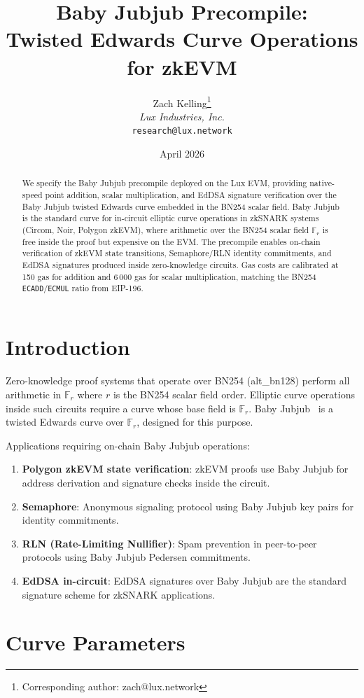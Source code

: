 \documentclass[11pt,a4paper]{article}
\title{Baby Jubjub Precompile:\\Twisted Edwards Curve Operations for zkEVM}
\author{
Zach Kelling\thanks{Corresponding author: zach@lux.network}\\
\textit{Lux Industries, Inc.}\\
\texttt{research@lux.network}
}
\date{April 2026}
\begin{document}
\luxcoverpage

\begin{abstract}
We specify the Baby Jubjub precompile deployed on the Lux EVM, providing native-speed
point addition, scalar multiplication, and EdDSA signature verification over the
Baby Jubjub twisted Edwards curve embedded in the BN254 scalar field.
Baby Jubjub is the standard curve for in-circuit elliptic curve operations in
zkSNARK systems (Circom, Noir, Polygon zkEVM), where arithmetic over the BN254
scalar field $\mathbb{F}_r$ is free inside the proof but expensive on the EVM.
The precompile enables on-chain verification of zkEVM state transitions,
Semaphore/RLN identity commitments, and EdDSA signatures produced inside
zero-knowledge circuits. Gas costs are calibrated at 150 gas for addition and
6\,000 gas for scalar multiplication, matching the BN254 \texttt{ECADD}/\texttt{ECMUL}
ratio from EIP-196.
\end{abstract}

\section{Introduction}

Zero-knowledge proof systems that operate over BN254 (alt\_bn128) perform all
arithmetic in $\mathbb{F}_r$ where $r$ is the BN254 scalar field order. Elliptic
curve operations inside such circuits require a curve whose base field is $\mathbb{F}_r$.
Baby Jubjub~\cite{babyjubjub} is a twisted Edwards curve over $\mathbb{F}_r$,
designed for this purpose.

Applications requiring on-chain Baby Jubjub operations:
\begin{enumerate}[label=(\roman*)]
  \item \textbf{Polygon zkEVM state verification}: zkEVM proofs use Baby Jubjub
    for address derivation and signature checks inside the circuit.
  \item \textbf{Semaphore}: Anonymous signaling protocol using Baby Jubjub
    key pairs for identity commitments.
  \item \textbf{RLN (Rate-Limiting Nullifier)}: Spam prevention in peer-to-peer
    protocols using Baby Jubjub Pedersen commitments.
  \item \textbf{EdDSA in-circuit}: EdDSA signatures over Baby Jubjub are the
    standard signature scheme for zkSNARK applications.
\end{enumerate}

\section{Curve Parameters}
\end{document}
